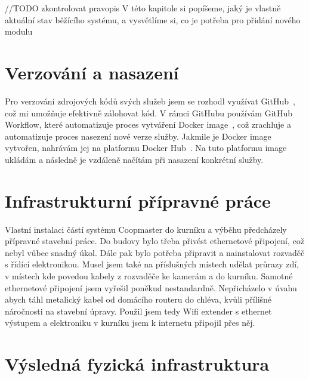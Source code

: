 //TODO zkontrolovat pravopis\newline
V této kapitole si popíšeme, jaký je vlastně aktuální stav běžícího systému, a vysvětlíme si, co je potřeba pro přidání nového modulu

\section*{Verzování a nasazení}

Pro verzování zdrojových kódů svých služeb jsem se rozhodl využívat GitHub~\cite{GitHubExplanation}, což mi umožňuje efektivně zálohovat kód.
V rámci GitHubu používám GitHub Workflow, které automatizuje proces vytváření Docker image~\cite{GitHubActionsDocker}, což zrachluje a automatizuje proces nasezení nové verze služby.
Jakmile je Docker image vytvořen, nahrávám jej na platformu Docker Hub~\cite{DockerHub}.
Na tuto platformu image ukládám a následně je vzdáleně načítám při nasazení konkrétní služby.

\section*{Infrastrukturní přípravné práce}

Vlastní instalaci částí systému Coopmaster do kurníku a výběhu předcházely přípravné stavební práce.
Do budovy bylo třeba přivést ethernetové připojení, což nebyl vůbec snadný úkol.
Dále pak bylo potřeba připravit a nainstalovat rozvaděč s řídící elektronikou.
Musel jsem také na příslušných místech udělat průrazy zdí, v místech kde povedou kabely z rozvaděče ke kamerám a do kurníku.
Samotné ethernetové připojení jsem vyřešil poněkud nestandardně.
Nepřicházelo v úvahu abych táhl metalický kabel od domácího routeru do chléva, kvůli přílišné náročnosti na stavební úpravy.
Použil jsem tedy Wifi extender s ethernet výstupem a elektroniku v kurníku jsem k internetu připojil přes něj.

\section*{Výsledná fyzická infrastruktura}

